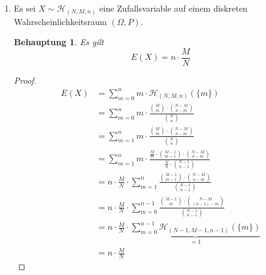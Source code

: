 \documentclass[a4paper]{scrartcl}
\newtheorem*{behaupt}{Behauptung}
\begin{document}
\begin{enumerate}[label=\bfseries\arabic*.]
    \item
        Es sei $X \sim \mathcal{H}_{(N, M, n)}$ eine Zufallsvariable auf einem
        diskreten Wahrscheinlichkeitsraum $(\Omega, P)$.
        \begin{behaupt}
            Es gilt
            \begin{equation*}
                E(X) = n \cdot \frac{M}{N}
            \end{equation*}
        \end{behaupt}
        \begin{proof}
            \begin{equation*}
                \begin{split}
                    E(X)
                    &= \sum_{m=0}^n m \cdot \mathcal{H}_{(N, M, n)} (\{m\}) \\
                    &= \sum_{m=0}^n m \cdot
                        \frac{\binom{M}{m} \cdot \binom{N-M}{n-m}}
                             {\binom{N}{n}} \\
                    &= \sum_{m=1}^n m \cdot
                        \frac{\binom{M}{m} \cdot \binom{N-M}{n-m}}
                             {\binom{N}{n}} \\
                    &= \sum_{m=1}^n m \cdot
                        \frac{\frac{M}{m} \cdot \binom{M-1}{m-1} \cdot
                        \binom{N-M}{n-m}}{\frac{N}{n} \cdot \binom{N-1}{n-1}} \\
                    &= n \cdot \frac{M}{N} \cdot \sum_{m=1}^n
                        \frac{\binom{M-1}{m-1} \cdot
                        \binom{N-M}{n-m}}{\binom{N-1}{n-1}} \\
                    &= n \cdot \frac{M}{N} \cdot \sum_{m=0}^{n-1}
                        \frac{\binom{M-1}{m} \cdot
                        \binom{N-M}{(n-1) -m}}{\binom{N-1}{n-1}} \\
                    &= n \cdot \frac{M}{N} \cdot \underbrace{\sum_{m=0}^{n-1}
                        \mathcal{H}_{(N-1, M-1, n-1)}(\{m\})}_{= 1} \\
                    &= n \cdot \frac{M}{N}
                \end{split}
            \end{equation*}
        \end{proof}


\end{enumerate}
\end{document}
